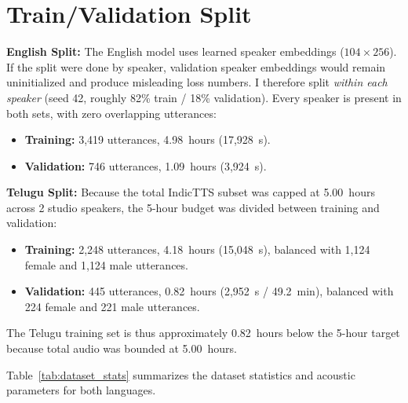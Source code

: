 \documentclass[11pt,a4paper]{report}
\begin{document}
\section{Train/Validation Split}\label{sec:splits}
\textbf{English Split:} The English model uses learned speaker embeddings ($104 \times 256$). If the split were done by speaker, validation speaker embeddings would remain uninitialized and produce misleading loss numbers. I therefore split \emph{within each speaker} (seed 42, roughly 82\% train / 18\% validation). Every speaker is present in both sets, with zero overlapping utterances:
\begin{itemize}
    \item \textbf{Training:} 3{,}419 utterances, 4.98~hours (17{,}928~s).
    \item \textbf{Validation:} 746 utterances, 1.09~hours (3{,}924~s).
\end{itemize}

\textbf{Telugu Split:} Because the total IndicTTS subset was capped at 5.00~hours across 2 studio speakers, the 5-hour budget was divided between training and validation:
\begin{itemize}
    \item \textbf{Training:} 2{,}248 utterances, 4.18~hours (15{,}048~s), balanced with 1{,}124 female and 1{,}124 male utterances.
    \item \textbf{Validation:} 445 utterances, 0.82~hours (2{,}952~s / 49.2~min), balanced with 224 female and 221 male utterances.
\end{itemize}
The Telugu training set is thus approximately 0.82~hours below the 5-hour target because total audio was bounded at 5.00~hours.

Table~\ref{tab:dataset_stats} summarizes the dataset statistics and acoustic parameters for both languages.
\end{document}
